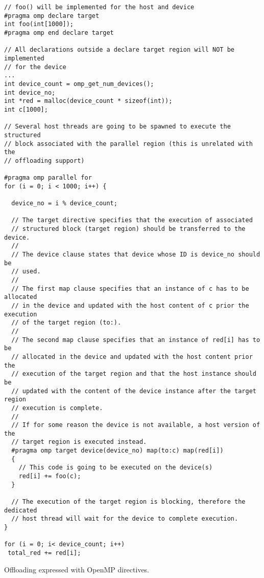 \begin{example}
\lstset{basicstyle=\scriptsize,frame=single}
\begin{lstlisting}
// foo() will be implemented for the host and device
#pragma omp declare target
int foo(int[1000]);
#pragma omp end declare target

// All declarations outside a declare target region will NOT be implemented
// for the device 
...
int device_count = omp_get_num_devices();
int device_no;
int *red = malloc(device_count * sizeof(int));
int c[1000];

// Several host threads are going to be spawned to execute the structured 
// block associated with the parallel region (this is unrelated with the
// offloading support)

#pragma omp parallel for
for (i = 0; i < 1000; i++) {

  device_no = i % device_count;

  // The target directive specifies that the execution of associated 
  // structured block (target region) should be transferred to the device. 
  //
  // The device clause states that device whose ID is device_no should be 
  // used.
  // 
  // The first map clause specifies that an instance of c has to be allocated 
  // in the device and updated with the host content of c prior the execution 
  // of the target region (to:).
  //
  // The second map clause specifies that an instance of red[i] has to be 
  // allocated in the device and updated with the host content prior the 
  // execution of the target region and that the host instance should be 
  // updated with the content of the device instance after the target region 
  // execution is complete.
  //
  // If for some reason the device is not available, a host version of the 
  // target region is executed instead.
  #pragma omp target device(device_no) map(to:c) map(red[i])
  { 
    // This code is going to be executed on the device(s)
    red[i] += foo(c); 
  }

  // The execution of the target region is blocking, therefore the dedicated 
  // host thread will wait for the device to complete execution.
}

for (i = 0; i< device_count; i++)
 total_red += red[i];
\end{lstlisting}
\lstset{basicstyle=\small\bfseries,frame=none}
\caption{Offloading expressed with OpenMP directives.}
\label{ex:OffloadingExample}
\end{example}